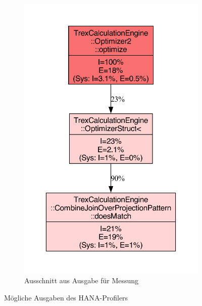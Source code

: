 \begin{figure}
\begin{subfigure}[b]{0.45\textwidth}
        \includegraphics[width=\textwidth, page=1]{Bilder/pdf/2048.1.cpu.pdf}
        \caption{Ausschnitt aus Ausgabe für Messung}\label{fig:profiling_art_1}
    \end{subfigure}
    \caption{Mögliche Ausgaben des HANA-Profilers}\label{fig:profiler_ausgabe}
\end{figure}

